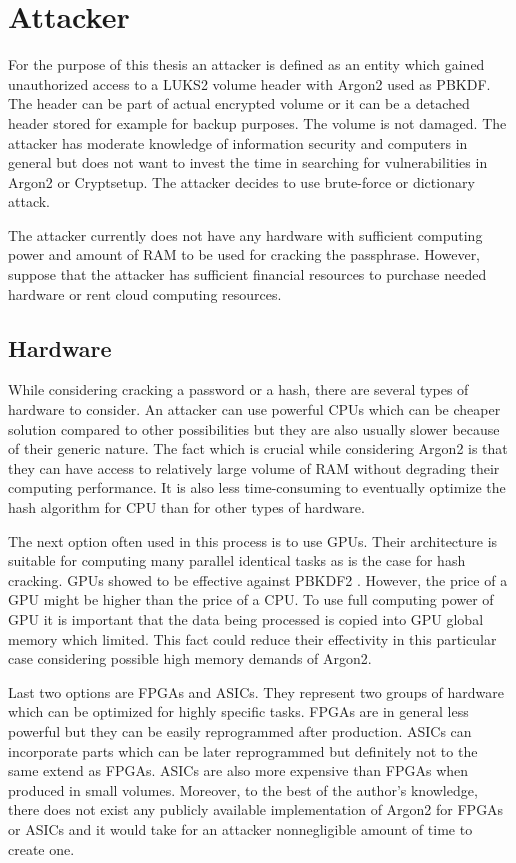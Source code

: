 \documentclass[nolof]{fithesis3}
\begin{document}
\section{Attacker}
For the purpose of this thesis an attacker is defined as an entity which gained unauthorized access to a LUKS2 volume header with Argon2 used as PBKDF. The header can be part of actual encrypted volume or it can be a detached header stored for example for backup purposes. The volume is not damaged. The attacker has moderate knowledge of information security and computers in general but does not want to invest the time in searching for vulnerabilities in Argon2 or Cryptsetup. The attacker decides to use brute-force or dictionary attack.

The attacker currently does not have any hardware with sufficient computing power and amount of RAM to be used for cracking the passphrase. However, suppose that the attacker has sufficient financial resources to purchase needed hardware or rent cloud computing resources.

\subsection{Hardware}
While considering cracking a password or a hash, there are several types of hardware to consider. An attacker can use powerful CPUs which can be cheaper solution compared to other possibilities but they are also usually slower because of their generic nature. The fact which is crucial while considering Argon2 is that they can have access to relatively large volume of RAM without degrading their computing performance. It is also less time-consuming to eventually optimize the hash algorithm for CPU than for other types of hardware.

The next option often used in this process is to use GPUs. Their architecture is suitable for computing many parallel identical tasks as is the case for hash cracking. GPUs showed to be effective against PBKDF2 \parencite{mosnacek}. However, the price of a GPU might be higher than the price of a CPU. To use full computing power of GPU it is important that the data being processed is copied into GPU global memory which limited. This fact could  reduce their effectivity in this particular case considering possible high memory demands of Argon2.

Last two options are FPGAs and ASICs. They represent two groups of hardware which can be optimized for highly specific tasks. FPGAs are in general less powerful but they can be easily reprogrammed after production. ASICs can incorporate parts which can be later reprogrammed but definitely not to the same extend as FPGAs. ASICs are also more expensive than FPGAs when produced in small volumes. Moreover, to the best of the author's knowledge, there does not exist any publicly available implementation of Argon2 for FPGAs or ASICs and it would take for an attacker nonnegligible amount of time to create one.
\end{document}

